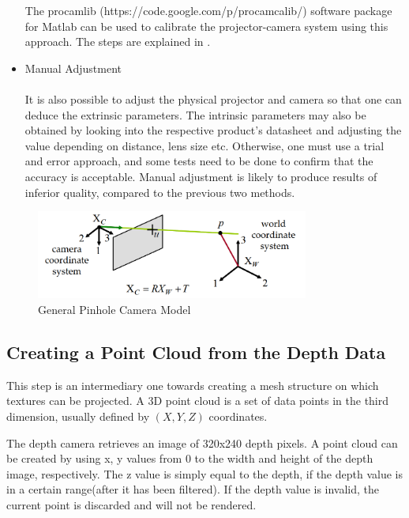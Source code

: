 \documentclass[]{article}
\begin{document}
\begin{itemize}
The procamlib (https://code.google.com/p/procamcalib/) software package for Matlab can be used to calibrate the projector-camera system using this approach. The steps are explained in \cite{falcao08}.\\
\item Manual Adjustment\\
\\It is also possible to adjust the physical projector and camera so that one can deduce the extrinsic parameters. The intrinsic parameters may also be obtained by looking into the respective product's datasheet and adjusting the value depending on distance, lens size etc. Otherwise, one must use a trial and error approach, and some tests need to be done to confirm that the accuracy is acceptable. Manual adjustment is likely to produce results of inferior quality, compared to the previous two methods.
\end{itemize}

\begin{figure}[hbtp]
    \centering
    \includegraphics[width=0.8\textwidth]{figures/GeneralPinholeModel.PNG}
    \caption{General Pinhole Camera Model}
    \label{fig:PinholeCameraModel}
\end{figure}

\subsection{Creating a Point Cloud from the Depth Data}

This step is an intermediary one towards creating a mesh structure on which textures can be projected. A 3D point cloud is a set of data points in the third dimension, usually defined by $(X, Y, Z)$ coordinates.

The depth camera retrieves an image of 320x240 depth pixels. A point cloud can be created by using x, y values from 0 to the width and height of the depth image, respectively. The z value is simply equal to the depth, if the depth value is in a certain range(after it has been filtered). If the depth value is invalid, the current point is discarded and will not be rendered.
\end{document}
